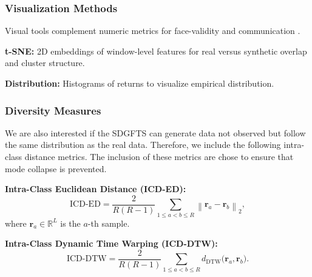\documentclass[sigconf]{acmart}
\begin{document}
          \subsubsection{Visualization Methods} \label{sec:visualization_methods}
          Visual tools complement numeric metrics for face-validity and 
          communication \cite{Ang23}.
          \begin{enumerate}[label=\textbf{[M\arabic*]}, resume]
          \item \label{metric:tsne} \textbf{t-SNE:}  
          2D embeddings of window-level features for real 
          versus synthetic overlap and cluster structure.
          
          \item \label{metric:dist} \textbf{Distribution:}  
          Histograms of returns to visualize empirical 
          distribution.
          \end{enumerate}
          
          \subsubsection{Diversity Measures}
          We are also interested if the SDGFTS can generate data
          not observed but follow the same distribution as the real data.
          Therefore, we include the following intra-class distance
          metrics. The inclusion of
          these metrics are chose to ensure that mode collapse 
          is prevented. 

          
          \begin{enumerate}[label=\textbf{[M\arabic*]}, resume]
          \item \label{metric:ed} \textbf{Intra-Class Euclidean 
          Distance (ICD-ED):}  
          \[
          \mathrm{ICD\text{-}ED} = \frac{2}{R(R-1)} 
          \sum_{1 \le a < b \le R} \left\| \textbf{r}_a - 
          \textbf{r}_b \right\|_2,
          \]
          where \(\textbf{r}_a \in \mathbb{R}^{L}\) is the \(a\)-th 
          sample.
          
          \item \label{metric:dtw} \textbf{Intra-Class Dynamic Time 
          Warping (ICD-DTW):}  
          \[
          \mathrm{ICD\text{-}DTW} = \frac{2}{R(R-1)} 
          \sum_{1 \le a < b \le R} d_{\mathrm{DTW}}\bigl(
          \textbf{r}_a, \textbf{r}_b\bigr).
          \]
          \end{enumerate}
          
\end{document}
